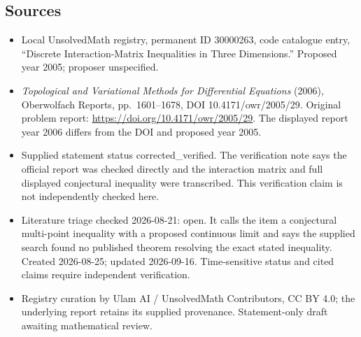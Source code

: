 \documentclass[11pt]{article}
\begin{document}
\subsection{Sources}
\begin{itemize}
\item Local UnsolvedMath registry, permanent ID 30000263, code catalogue entry, ``Discrete Interaction-Matrix Inequalities in Three Dimensions.'' Proposed year 2005; proposer unspecified.
\item \emph{Topological and Variational Methods for Differential Equations} (2006), Oberwolfach Reports, pp.\ 1601--1678, DOI 10.4171/owr/2005/29. Original problem report: \url{https://doi.org/10.4171/owr/2005/29}. The displayed report year 2006 differs from the DOI and proposed year 2005.
\item Supplied statement status corrected\_verified. The verification note says the official report was checked directly and the interaction matrix and full displayed conjectural inequality were transcribed. This verification claim is not independently checked here.
\item Literature triage checked 2026-08-21: open. It calls the item a conjectural multi-point inequality with a proposed continuous limit and says the supplied search found no published theorem resolving the exact stated inequality. Created 2026-08-25; updated 2026-09-16. Time-sensitive status and cited claims require independent verification.
\item Registry curation by Ulam AI / UnsolvedMath Contributors, CC BY 4.0; the underlying report retains its supplied provenance. Statement-only draft awaiting mathematical review.
\end{itemize}
\end{document}
